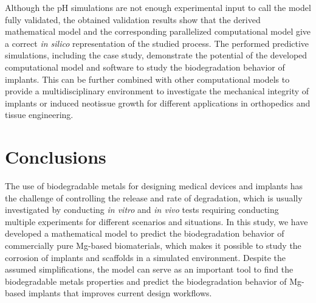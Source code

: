 Although the pH simulations are not enough experimental input to call the model fully validated, the obtained validation results show that the derived mathematical model and the corresponding parallelized computational model give a correct \textit{in silico} representation of the studied process. The performed predictive simulations, including the case study, demonstrate the potential of the developed computational model and software to study the biodegradation behavior of implants. This can be further combined with other computational models to provide a multidisciplinary environment to investigate the mechanical integrity of implants or induced neotissue growth for different applications in orthopedics and tissue engineering.

\section{Conclusions}

The use of biodegradable metals for designing medical devices and implants has the challenge of controlling the release and rate of degradation, which is usually investigated by conducting \textit{in vitro} and \textit{in vivo} tests requiring conducting multiple experiments for different scenarios and situations. In this study, we have developed a mathematical model to predict the biodegradation behavior of commercially pure Mg-based biomaterials, which makes it possible to study the corrosion of implants and scaffolds in a simulated environment. Despite the assumed simplifications, the model can serve as an important tool to find the biodegradable metals properties and predict the biodegradation behavior of Mg-based implants that improves current design workflows.



\cleardoublepage
